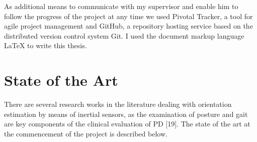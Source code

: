 As additional means to communicate with my supervisor and enable him to follow the progress of the project at any time we used Pivotal Tracker, a tool for agile project management and GitHub, a repository hosting service based on the distributed version control system Git. I used the document markup language \LaTeX{} to write this thesis.

\section{State of the Art}

There are several research works in the literature dealing with orientation estimation by means of inertial sensors, as the examination of posture and gait are key components of the clinical evaluation of PD [19]. The state of the art at the commencement of the project is described below.

